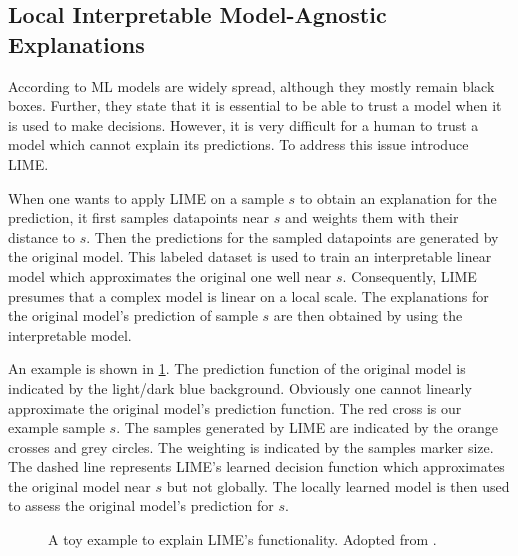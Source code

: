 \subsection{Local Interpretable Model-Agnostic Explanations}
\label{chp:fundamentals:sec:machine_learning:subsec:transfer_learning}
According to \textcite{Ribeiro:2016} \ac{ML} models are widely spread, although they mostly remain black boxes.
Further, they state that it is essential to be able to trust a model when it is used to make decisions.
However, it is very difficult for a human to trust a model which cannot explain its predictions.
To address this issue \textcite{Ribeiro:2016} introduce \ac{LIME}.

When one wants to apply \ac{LIME} on a sample $s$ to obtain an explanation for the prediction, it first samples datapoints near $s$ and weights them with their distance to $s$.
Then the predictions for the sampled datapoints are generated by the original model.
This labeled dataset is used to train an interpretable linear model which approximates the original one well near $s$.
Consequently, \ac{LIME} presumes that a complex model is linear on a local scale.
The explanations for the original model's prediction of sample $s$ are then obtained by using the interpretable model. \parencite{Ribeiro:2016}

An example is shown in \cref{fig:fundamentals:LIME}.
The prediction function of the original model is indicated by the light/dark blue background.
Obviously one cannot linearly approximate the original model's prediction function.
The red cross is our example sample $s$.
The samples generated by \ac{LIME} are indicated by the orange crosses and grey circles.
The weighting is indicated by the samples marker size.
The dashed line represents \ac{LIME}'s learned decision function which approximates the original model near $s$ but not globally.
The locally learned model is then used to assess the original model's prediction for $s$.
\begin{figure}[htpb]
    \centering
    
    \caption[LIME Example Data]{A toy example to explain \ac{LIME}'s functionality. Adopted from \textcite{Ribeiro:2016}.}\label{fig:fundamentals:LIME}
\end{figure}
